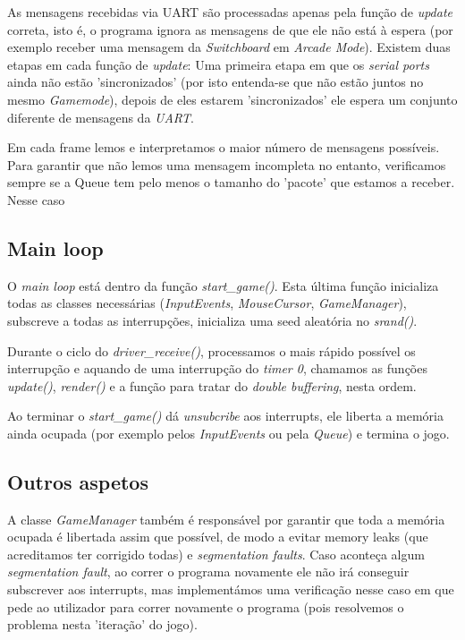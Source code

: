 \documentclass{report}
\begin{document}
As mensagens recebidas via UART são processadas apenas pela função de \textit{update} correta, isto é, o programa ignora as mensagens de que ele não está à espera (por exemplo receber uma mensagem da \textit{Switchboard} em \textit{Arcade Mode}).
Existem duas etapas em cada função de \textit{update}: Uma primeira etapa em que os \textit{serial ports} ainda não estão 'sincronizados' (por isto entenda-se que não estão juntos no mesmo \textit{Gamemode}), depois de eles estarem 'sincronizados' ele espera um conjunto diferente de mensagens da \textit{UART}.

Em cada frame lemos e interpretamos o maior número de mensagens possíveis. Para garantir que não lemos uma mensagem incompleta no entanto, verificamos sempre se a Queue tem pelo menos o tamanho do 'pacote' que estamos a receber. Nesse caso 

\subsection{Main loop}

O \textit{main loop} está dentro da função \textit{start\_game()}. Esta última função inicializa todas as classes necessárias (\textit{InputEvents}, \textit{MouseCursor}, \textit{GameManager}), subscreve a todas as interrupções, inicializa uma seed aleatória no \textit{srand()}.

Durante o ciclo do \textit{driver\_receive()}, processamos o mais rápido possível os interrupção e aquando de uma interrupção do \textit{timer 0}, chamamos as funções \textit{update()}, \textit{render()} e a função para tratar do \textit{double buffering}, nesta ordem.

Ao terminar o \textit{start\_game()} dá \textit{unsubcribe} aos interrupts, ele liberta a memória ainda ocupada (por exemplo pelos \textit{InputEvents} ou pela \textit{Queue}) e termina o jogo.

\subsection{Outros aspetos}

A classe \textit{GameManager} também é responsável por garantir que toda a memória ocupada é libertada assim que possível, de modo a evitar memory leaks (que acreditamos ter corrigido todas) e \textit{segmentation faults}. Caso aconteça algum \textit{segmentation fault}, ao correr o programa novamente ele não irá conseguir subscrever aos interrupts, mas implementámos uma verificação nesse caso em que pede ao utilizador para correr novamente o programa (pois resolvemos o problema nesta 'iteração' do jogo).
\end{document}
